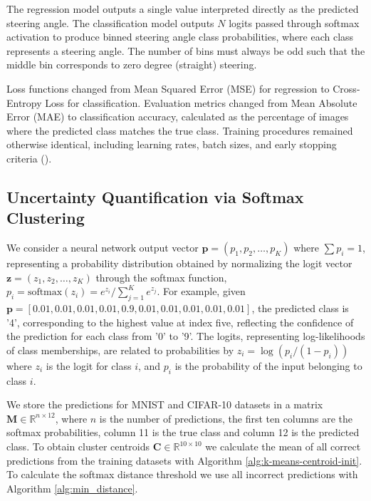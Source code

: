 The regression model outputs a single value interpreted directly as the predicted steering angle. The classification model outputs $N$ logits passed through softmax activation to produce binned steering angle class probabilities, where each class represents a steering angle. The number of bins must always be odd such that the middle bin corresponds to zero degree (straight) steering.

Loss functions changed from Mean Squared Error (MSE) for regression to Cross-Entropy Loss for classification. Evaluation metrics changed from Mean Absolute Error (MAE) to classification accuracy, calculated as the percentage of images where the predicted class matches the true class. Training procedures remained otherwise identical, including learning rates, batch sizes, and early stopping criteria (\cite{goodfellow2016deep}).


\subsection{Uncertainty Quantification via Softmax Clustering}
\label{methods:clustering}

\sloppy

We consider a neural network output vector $\mathbf{p} = (p_1, p_2, \dots, p_K)$ where $\sum p_i = 1$, representing a probability distribution obtained by normalizing the logit vector $\mathbf{z} = (z_1, z_2, \dots, z_K)$ through the softmax function, $p_i = \text{softmax}(z_i) = e^{z_i} / \sum_{j=1}^{K} e^{z_j}$. For example, given $\mathbf{p} = [0.01, 0.01, 0.01, 0.01, 0.9, 0.01, 0.01, 0.01, 0.01, 0.01]$, the predicted class is '4', corresponding to the highest value at index five, reflecting the confidence of the prediction for each class from '0' to '9'. The logits, representing log-likelihoods of class memberships, are related to probabilities by $z_i = \log (p_i / (1 - p_i))$ where $z_i$ is the logit for class $i$, and $p_i$ is the probability of the input belonging to class $i$.

We store the predictions for MNIST and CIFAR-10 datasets in a matrix $\mathbf{M} \in \mathbb{R}^{n \times 12}$, where $n$ is the number of predictions, the first ten columns are the softmax probabilities, column 11 is the true class and column 12 is the predicted class.
To obtain cluster centroids $\mathbf{C} \in \mathbb{R}^{10 \times 10}$ we calculate the mean of all correct predictions from the training datasets with Algorithm \ref{alg:k-means-centroid-init}. To calculate the softmax distance threshold we use all incorrect predictions with Algorithm \ref{alg:min_distance}.

